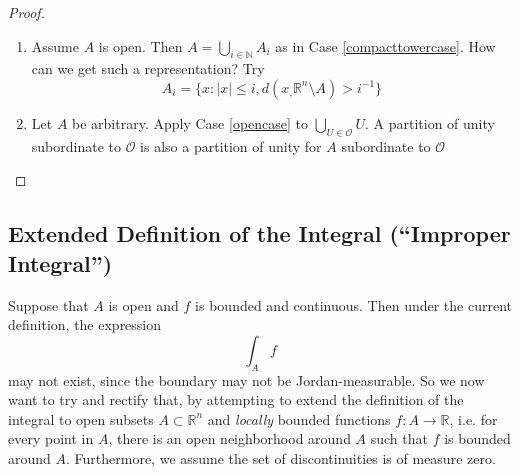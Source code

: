 \documentclass{article}
\newcommand{\reals}[0]{\mathbb{R}}
\newcommand{\nats}[0]{\mathbb{N}}
\newcommand{\mc}[1]{\mathcal{#1}}
\begin{document}
\begin{proof}
\begin{enumerate}
    \label{compacttowercase}

    \item Assume \(A\) is open. Then \(A = \bigcup_{i \in \nats}A_i\) as in Case \ref{compacttowercase}. How can we get such a representation? Try
    \begin{equation}
      A_i = \{x : |x| \leq i, d(x_, \reals^n \setminus A) > i^{-1}\}
    \end{equation}

    \label{opencase}

    \item Let \(A\) be arbitrary. Apply Case \ref{opencase} to \(\bigcup_{U \in \mc{O}}U\). A partition of unity subordinate to \(\mc{O}\) is also a partition of unity for \(A\) subordinate to \(\mc{O}\)

  \end{enumerate}

\end{proof}

\subsection{Extended Definition of the Integral (``Improper Integral'')}
Suppose that \(A\) is open and \(f\) is bounded and continuous. Then under the current definition, the expression
\begin{equation}
  \int_Af
\end{equation}
may not exist, since the boundary may not be Jordan-measurable. So we now want to try and rectify that, by attempting to extend the definition of the integral to open subsets \(A \subset \reals^n\) and \textit{locally} bounded functions \(f: A \to \reals\), i.e. for every point in \(A\), there is an open neighborhood around \(A\) such that \(f\) is bounded around \(A\). Furthermore, we assume the set of discontinuities is of measure zero.
\end{document}
